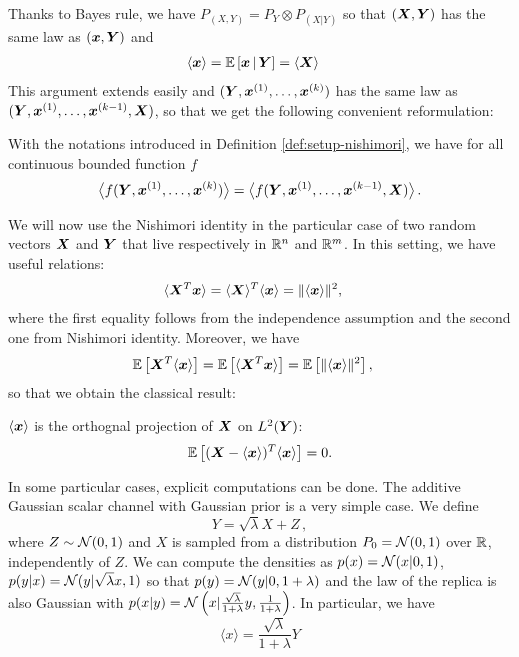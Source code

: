 \documentclass[12pt,nocut]{article}
\begin{document}
Thanks to Bayes rule, we have $P_{(X,Y)} = P_{Y}\!\otimes \! P_{(X|Y)}$ so that $({\boldsymbol X},{\boldsymbol Y})$ has the same law as $({\boldsymbol x},{\boldsymbol Y})$ and
\begin{align*}
\langle {\boldsymbol x} \rangle &= \mathbb{E}\left[ {\boldsymbol x} \, | \, {\boldsymbol Y} \right] = \langle {\boldsymbol X} \rangle
\end{align*}
This argument extends easily and $({\boldsymbol Y},{\boldsymbol x}^{(1)}, \dots, {\boldsymbol x}^{(k)})$ has the same law as $({\boldsymbol Y},{\boldsymbol x}^{(1)}, \dots,{\boldsymbol x}^{(k-1)}, {\boldsymbol X})$, so that we get the following convenient reformulation:
\begin{proposition} \label{prop:nishimori}
With the notations introduced in Definition \ref{def:setup-nishimori}, we have for all continuous bounded function $f$
	$$
\big\langle f({\boldsymbol Y},{\boldsymbol x}^{(1)}, \dots, {\boldsymbol x}^{(k)}) \big\rangle
	=
\big\langle f({\boldsymbol Y},{\boldsymbol x}^{(1)}, \dots, {\boldsymbol x}^{(k-1)}, {\boldsymbol X}) \big\rangle\,.
	$$
\end{proposition}

We will now use the Nishimori identity in the particular case of two random vectors ${\boldsymbol X}$ and ${\boldsymbol Y}$ that live respectively in $\mathbb{R}^n$ and $\mathbb{R}^m$.
In this setting, we have useful relations:
\begin{align*}
\langle {\boldsymbol X}^T {\boldsymbol x} \rangle &=  \langle {\boldsymbol X} \rangle^T \langle {\boldsymbol x} \rangle =\| \langle {\boldsymbol x} \rangle\|^2,
\end{align*}
where the first equality follows from the independence assumption and the second one from Nishimori identity. Moreover, we have
\begin{align*}
\mathbb{E} \left[ {\boldsymbol X}^T \langle {\boldsymbol x} \rangle \right] &=  \mathbb{E} \left[\langle {\boldsymbol X}^T {\boldsymbol x} \rangle\right] = \mathbb{E} \left[\| \langle {\boldsymbol x} \rangle\|^2 \right],
\end{align*}
so that we obtain the classical result:
\begin{proposition}
$\langle {\boldsymbol x} \rangle$ is the orthognal projection of ${\boldsymbol X}$ on $L^2({\boldsymbol Y})$:
\begin{align*}
\mathbb{E} \left[ ({\boldsymbol X}- \langle {\boldsymbol x} \rangle)^T \langle {\boldsymbol x} \rangle \right] = 0.
\end{align*}
\end{proposition}

\begin{example}
In some particular cases, explicit computations can be done. The additive Gaussian scalar channel with Gaussian prior is a very simple case. We define
\begin{equation}\label{eq:additive_scalar_channel}
	Y = \sqrt{\lambda} X + Z \,,
\end{equation}
where $Z \sim \mathcal{N}(0,1)$ and $X$ is sampled from a distribution $P_0= \mathcal{N}(0,1)$ over $\mathbb{R}$, independently of $Z$. We can compute the densities as $p(x) = \mathcal{N}(x|0,1)$, $p(y|x) = \mathcal{N}(y|\sqrt{\lambda} x,1)$ so that $p(y) = \mathcal{N}(y|0, 1+\lambda)$ and the law of the replica is also Gaussian with $p(x|y) =\mathcal{N}\left(x|\frac{\sqrt{\lambda}}{1+\lambda}y,\frac{1}{1+\lambda}\right)$. In particular, we have
$$
\langle x \rangle = \frac{\sqrt{\lambda}}{1+\lambda}Y
$$
\end{example}
\end{document}
